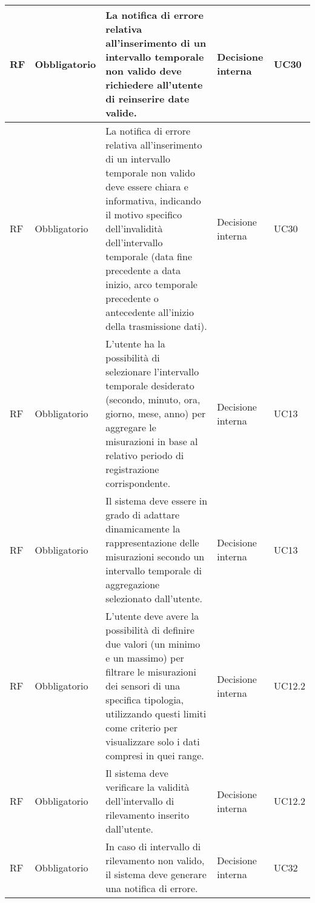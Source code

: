 \begin{longtable}{|C{1.5cm}|C{2cm}|L{5cm}|C{2cm}|C{1.5cm}|}
    \hline
     RF & Obbligatorio & La notifica di errore relativa all'inserimento di un intervallo temporale non valido deve richiedere all'utente di reinserire date valide. & Decisione interna & UC30 \\
    
    \hline
     RF & Obbligatorio & La notifica di errore relativa all'inserimento di un intervallo temporale non valido deve essere chiara e informativa, indicando il motivo specifico dell'invalidità dell'intervallo temporale (data fine precedente a data inizio, arco temporale precedente o antecedente all'inizio della trasmissione dati). & Decisione interna & UC30 \\
    
    \hline
     RF & Obbligatorio & L'utente ha la possibilità di selezionare l'intervallo temporale desiderato (secondo, minuto, ora, giorno, mese, anno) per aggregare le misurazioni in base al relativo periodo di registrazione corrispondente. & Decisione interna & UC13 \\
    
    \hline
     RF & Obbligatorio & Il sistema deve essere in grado di adattare dinamicamente la rappresentazione delle misurazioni secondo un intervallo temporale di aggregazione selezionato dall'utente. & Decisione interna & UC13 \\
    
    \hline
     RF & Obbligatorio &  L'utente deve avere la possibilità di definire due valori (un minimo e un massimo) per filtrare le misurazioni dei sensori di una specifica tipologia, utilizzando questi limiti come criterio per visualizzare solo i dati compresi in quei range. & Decisione interna & UC12.2 \\
    
    \hline
     RF & Obbligatorio & Il sistema deve verificare la validità dell'intervallo di rilevamento inserito dall'utente. & Decisione interna & UC12.2 \\
    
    \hline
     RF & Obbligatorio & In caso di intervallo di rilevamento non valido, il sistema deve generare una notifica di errore. & Decisione interna & UC32 \\
    

\end{longtable}
